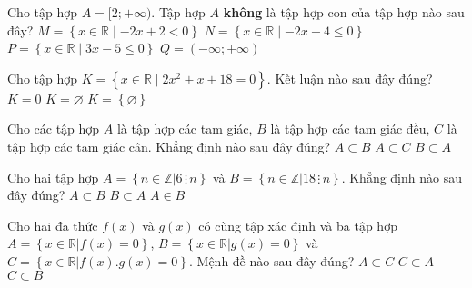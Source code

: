 \begin{ex}%
	Cho tập hợp $A = [2;+\infty)$. Tập hợp $A$ {\bf không} là tập hợp con của tập hợp nào sau đây?
	\choice
	{ $M  = \left\{x \in \mathbb{R} \mid -2x+2 < 0 \right\} $	}
	{$N  = \left\{x \in \mathbb{R} \mid -2x+4 \le 0 \right\} $}
	{\True $P  = \left\{x \in \mathbb{R} \mid 3x-5 \le 0 \right\} $}
	{ $Q = (-\infty;+\infty)$}
\end{ex}

\begin{ex}%
	Cho tập hợp $K = \left\{x \in \mathbb{R} \mid 2x^2+x+18 = 0\right\}.$ Kết luận nào sau đây  đúng?
	{$K = 0 $}
	{\True $K = \varnothing  $}
	{$K = \left\{\varnothing\right\} $}
\end{ex}

\begin{ex}%
	Cho các tập hợp $A$ là tập hợp các tam giác, $B$ là tập hợp các tam giác đều, $C$ là tập hợp các tam giác cân. Khẳng định nào sau đây đúng?
	{$A \subset B$}
	{$A \subset C$}
	{\True $B \subset A$}
\end{ex}

\begin{ex}%
	Cho hai tập hợp $A = \left\{n \in \mathbb{Z}\big| 6\, \vdots\,  n\right\}$ và $B = \left\{n \in \mathbb{Z}\big| 18\, \vdots\,  n\right\}$. Khẳng định nào sau đây đúng?
	{\True $A \subset B$}
	{$B \subset A$}
	{$A \in B$}
\end{ex}

\begin{ex}%
	Cho hai đa thức $f\left(x\right)$ và $g\left(x\right)$ có cùng tập xác định và ba tập hợp $A = \left\{x \in \mathbb{R}\big| f\left(x\right) = 0\right\}$, $B = \left\{x \in \mathbb{R}\big| g\left(x\right) = 0\right\}$ và $C = \left\{x \in \mathbb{R}\big| f\left(x\right).g\left(x\right) = 0\right\}$. Mệnh đề nào sau đây đúng?
	{\True $A \subset C$}
	{$C \subset A$}
	{$C \subset B$}
\end{ex}

